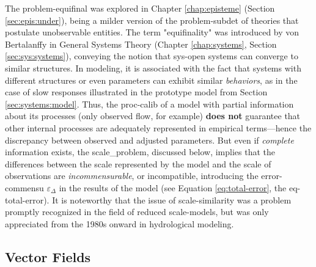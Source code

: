 \documentclass[./main_en.tex]{subfiles}
\begin{document}
\par The \gls{problem-equifinal} was explored in Chapter \ref{chap:episteme} (Section \ref{sec:epis:under}), being a milder version of the \gls{problem-subdet} of theories that postulate unobservable entities. The term "equifinality" was introduced by von Bertalanffy in General Systems Theory (Chapter \ref{chap:systems}, Section \ref{sec:sys:systems}), conveying the notion that \gls{sys-open} systems can converge to similar structures. In modeling, it is associated with the fact that systems with different structures or even \gls{parameters} can exhibit similar \textit{behaviors}, as in the case of slow responses illustrated in the prototype \gls{model} from Section \ref{sec:systems:model}. Thus, the \gls{proc-calib} of a \gls{model} with partial information about its processes (only observed flow, for example) \textbf{does not} guarantee that other internal processes are adequately represented in empirical terms—hence the discrepancy between observed and adjusted \gls{parameters}. But even if \textit{complete} information exists, the \gls{scale_problem}, discussed below, implies that the differences between the scale represented by the \gls{model} and the scale of observations are \textit{incommensurable}, or incompatible, introducing the \gls{error-commensu} $\varepsilon_{\Delta}$ in the results of the \gls{model} (see Equation \eqref{eq:total-error}, the \gls{eq-total-error}). It is noteworthy that the issue of \gls{scale-similarity} was a problem promptly recognized in the field of reduced \gls{scale-models}, but was only appreciated from the 1980s onward in hydrological modeling.

\subsection{Vector Fields} \label{sec:hydro:physical}
\end{document}
